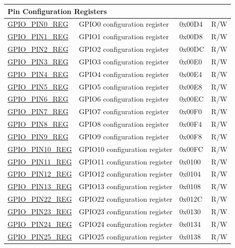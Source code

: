 \begin{longtable}{ | p{5.5cm} | p{6.2cm} | p{1.3cm} | p{2cm} | }
\multicolumn{4}{|l|}{\textbf{Pin Configuration Registers}} \\ \hline
\hyperref[regdesc:GPIOPINNREG]{GPIO\_PIN0\_REG} & GPIO0 configuration register & 0x00D4 & R/W \\ \hline
\hyperref[regdesc:GPIOPINNREG]{GPIO\_PIN1\_REG} & GPIO1 configuration register & 0x00D8 & R/W \\ \hline
\hyperref[regdesc:GPIOPINNREG]{GPIO\_PIN2\_REG} & GPIO2 configuration register & 0x00DC & R/W \\ \hline
\hyperref[regdesc:GPIOPINNREG]{GPIO\_PIN3\_REG} & GPIO3 configuration register & 0x00E0 & R/W \\ \hline
\hyperref[regdesc:GPIOPINNREG]{GPIO\_PIN4\_REG} & GPIO4 configuration register & 0x00E4 & R/W \\ \hline
\hyperref[regdesc:GPIOPINNREG]{GPIO\_PIN5\_REG} & GPIO5 configuration register & 0x00E8 & R/W \\ \hline
\hyperref[regdesc:GPIOPINNREG]{GPIO\_PIN6\_REG} & GPIO6 configuration register & 0x00EC & R/W \\ \hline
\hyperref[regdesc:GPIOPINNREG]{GPIO\_PIN7\_REG} & GPIO7 configuration register & 0x00F0 & R/W \\ \hline
\hyperref[regdesc:GPIOPINNREG]{GPIO\_PIN8\_REG} & GPIO8 configuration register & 0x00F4 & R/W \\ \hline
\hyperref[regdesc:GPIOPINNREG]{GPIO\_PIN9\_REG} & GPIO9 configuration register & 0x00F8 & R/W \\ \hline
\hyperref[regdesc:GPIOPINNREG]{GPIO\_PIN10\_REG} & GPIO10 configuration register & 0x00FC & R/W \\ \hline
\hyperref[regdesc:GPIOPINNREG]{GPIO\_PIN11\_REG} & GPIO11 configuration register & 0x0100 & R/W \\ \hline
\hyperref[regdesc:GPIOPINNREG]{GPIO\_PIN12\_REG} & GPIO12 configuration register & 0x0104 & R/W \\ \hline
\hyperref[regdesc:GPIOPINNREG]{GPIO\_PIN13\_REG} & GPIO13 configuration register & 0x0108 & R/W \\ \hline
\hyperref[regdesc:GPIOPINNREG]{GPIO\_PIN22\_REG} & GPIO22 configuration register & 0x012C & R/W \\ \hline
\hyperref[regdesc:GPIOPINNREG]{GPIO\_PIN23\_REG} & GPIO23 configuration register & 0x0130 & R/W \\ \hline
\hyperref[regdesc:GPIOPINNREG]{GPIO\_PIN24\_REG} & GPIO24 configuration register & 0x0134 & R/W \\ \hline
\hyperref[regdesc:GPIOPINNREG]{GPIO\_PIN25\_REG} & GPIO25 configuration register & 0x0138 & R/W \\ \hline

\end{longtable}
